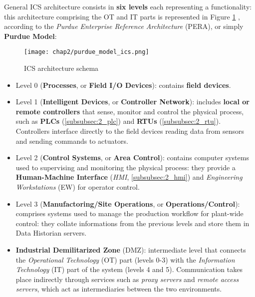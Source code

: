 \bigskip
General ICS architecture consists in \textbf{six levels} each representing a functionality: this architecture comprising the OT and IT parts is represented in Figure \ref{fig:2_SCADA_schema} \cite{purdue_model}\cite{tesi_phd_norvegese}, according to the \textit{Purdue Enterprise Reference Architecture} (PERA), or simply \textbf{Purdue Model}:

\begin{figure}[ht]
	\centering
	\texttt{[image: chap2/purdue\_model\_ics.png]}
	\caption{ICS architecture schema}
	\label{fig:2_SCADA_schema}
\end{figure}

\begin{itemize}
	\item Level 0 (\textbf{Processes}, or \textbf{Field I/O Devices}): contains \textbf{field devices}.
	
	\item Level 1 (\textbf{Intelligent Devices}, or \textbf{Controller Network}): includes \textbf{local or remote controllers} that sense, monitor and control the physical process, such as \textbf{PLCs} (\ref{subsubsec:2_plc}) and \textbf{RTUs} (\ref{subsubsec:2_rtu}). Controllers interface directly to the field devices reading data from sensors and sending commands to actuators.
	
	\item Level 2 (\textbf{Control Systems}, or \textbf{Area Control}): contains computer systems used to supervising and monitoring the physical process: they provide a \textbf{Human-Machine Interface} (\textit{HMI}, \ref{subsubsec:2_hmi}) and \textit{Engineering Workstations} (EW) for operator control.
	
	\item Level 3 (\textbf{Manufactoring/Site Operations}, or \textbf{Operations/Control}): comprises systems used to manage the production workflow for plant-wide control: they collate informations from the previous levels and store them in Data Historian servers.
	
	\item \textbf{Industrial Demilitarized Zone} (DMZ): intermediate level that connects the \textit{Operational Technology} (OT) part (levels 0-3) with the \textit{Information Technology} (IT) part of the system (levels 4 and 5). Communication takes place indirectly through services such as \textit{proxy servers} and \textit{remote access servers}, which act as intermediaries between the two environments.
	

\end{itemize}
